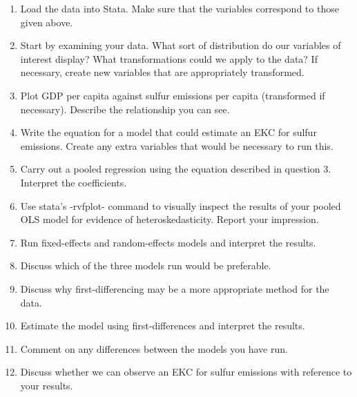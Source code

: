 \documentclass{scrartcl}
\begin{document}
	\begin{enumerate}
	\item Load the data into Stata. Make sure that the variables correspond to those given above.
	
	\item Start by examining your data. What sort of distribution do our variables of interest display? What transformations could we apply to the data? If necessary, create new variables that are appropriately transformed.
	
	\item Plot GDP per capita against sulfur emissions per capita (transformed if necessary). Describe the relationship you can see.
	
	\item Write the equation for a model that could estimate an EKC for sulfur emissions. Create any extra variables that would be necessary to run this.
	
	\item Carry out a pooled regression using the equation described in question 3. Interpret the coefficients.
	
	\item Use stata's -rvfplot- command to visually inspect the results of your pooled OLS model for evidence of heteroskedasticity. Report your impression.
	
	\item Run fixed-effects and random-effects models and interpret the results.
	
	\item Discuss which of the three models run would be preferable.
	
	\item Discuss why first-differencing may be a more appropriate method for the data.
	
	\item Estimate the model using first-differences and interpret the results.
	
	\item Comment on any differences between the models you have run.
	
	\item Discuss whether we can observe an EKC for sulfur emissions with reference to your results.
	
	\end{enumerate}
	
\end{document}
